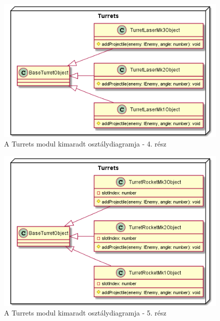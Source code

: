 \begin{figure}[h!]
	\centering
	\includegraphics[width=1\textwidth]{kepek/uml/turrets/turret-pt5.png}
	\caption{A Turrets modul kimaradt osztálydiagramja - 4. rész}
	\label{fig:uml:turret-pt5}
\end{figure}

\begin{figure}[h!]
	\centering
	\includegraphics[width=1\textwidth]{kepek/uml/turrets/turret-pt6.png}
	\caption{A Turrets modul kimaradt osztálydiagramja - 5. rész}
	\label{fig:uml:turret-pt6}
\end{figure}